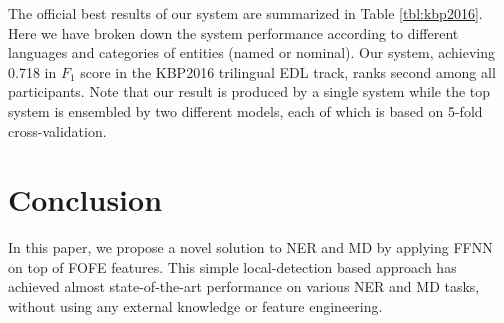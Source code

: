 \documentclass[11pt,a4paper]{article}
\begin{document}
The official best results of our system are summarized in Table \ref{tbl:kbp2016}. 
Here we have broken down the system performance according to different languages and categories of entities (named or nominal). Our system, achieving 0.718 in $F_1$ score in the KBP2016 trilingual EDL track, ranks second among all participants. Note that our result is produced by a single system while the top system is ensembled by two different models, each of which is based on 5-fold cross-validation.


\section{Conclusion}

In this paper, we propose a novel solution to NER and MD by applying FFNN on top of FOFE features.
This simple local-detection based approach has achieved almost state-of-the-art performance on various NER and MD tasks, without using any external knowledge or feature engineering.





	
	
\end{document}
